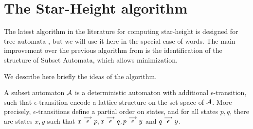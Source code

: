 \section{The Star-Height algorithm}

The latest algorithm in the literature for computing star-height is designed for tree automata \cite{CL08sh}, but we will use it here in the special case of words. The main improvement over the previous algorithm from \cite{Kirsten05} is the identification of the structure of Subset Automata, which allows minimization.

We describe here briefly the ideas of the algorithm.

\begin{definition}
A subset automaton $\mathcal{A}$ is a deterministic automaton with additional $\epsilon$-transition, such that $\epsilon$-transition encode a lattice structure on the set space of $\mathcal{A}$. More precisely, $\epsilon$-transitions define a partial order on states, and for all states $p,q$, there are states $x,y$ such that $x\stackrel{\longrightarrow}{\epsilon}p, x\stackrel{\longrightarrow}{\epsilon}q, p\stackrel{\longrightarrow}{\epsilon}y$ and $q\stackrel{\longrightarrow}{\epsilon}y$.
\end{definition}

